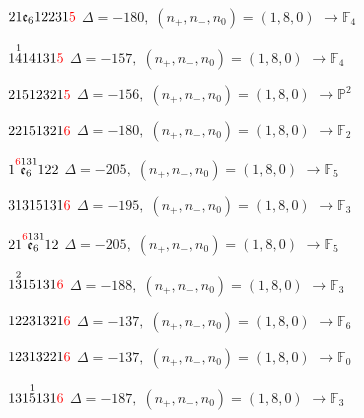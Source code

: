 \documentclass[10pt]{article}
\begin{document}
$21\mathfrak{e}_612231\textcolor{red}{5}$ \quad $\Delta=-180,\; (n_+,n_-,n_0)=(1,8,0)$ \quad $\to \mathbb{F}_{4}$

\smallskip

$1\overset{1}{4}14131\textcolor{red}{5}$ \quad $\Delta=-157,\; (n_+,n_-,n_0)=(1,8,0)$ \quad $\to \mathbb{F}_{4}$

\smallskip

$21512321\textcolor{red}{5}$ \quad $\Delta=-156,\; (n_+,n_-,n_0)=(1,8,0)$ \quad $\to \mathbb{P}^2$

\smallskip

$22151321\textcolor{red}{6}$ \quad $\Delta=-180,\; (n_+,n_-,n_0)=(1,8,0)$ \quad $\to \mathbb{F}_{2}$

\smallskip

$1\overset{\textcolor{red}{6}131}{\mathfrak{e}_6}122$ \quad $\Delta=-205,\; (n_+,n_-,n_0)=(1,8,0)$ \quad $\to \mathbb{F}_{5}$

\smallskip

$31315131\textcolor{red}{6}$ \quad $\Delta=-195,\; (n_+,n_-,n_0)=(1,8,0)$ \quad $\to \mathbb{F}_{3}$

\smallskip

$21\overset{\textcolor{red}{6}131}{\mathfrak{e}_6}12$ \quad $\Delta=-205,\; (n_+,n_-,n_0)=(1,8,0)$ \quad $\to \mathbb{F}_{5}$

\smallskip

$1\overset{2}{3}15131\textcolor{red}{6}$ \quad $\Delta=-188,\; (n_+,n_-,n_0)=(1,8,0)$ \quad $\to \mathbb{F}_{3}$

\smallskip

$12231321\textcolor{red}{6}$ \quad $\Delta=-137,\; (n_+,n_-,n_0)=(1,8,0)$ \quad $\to \mathbb{F}_{6}$

$12313221\textcolor{red}{6}$ \quad $\Delta=-137,\; (n_+,n_-,n_0)=(1,8,0)$ \quad $\to \mathbb{F}_{0}$

\smallskip

$131\overset{1}{5}131\textcolor{red}{6}$ \quad $\Delta=-187,\; (n_+,n_-,n_0)=(1,8,0)$ \quad $\to \mathbb{F}_{3}$
\end{document}

